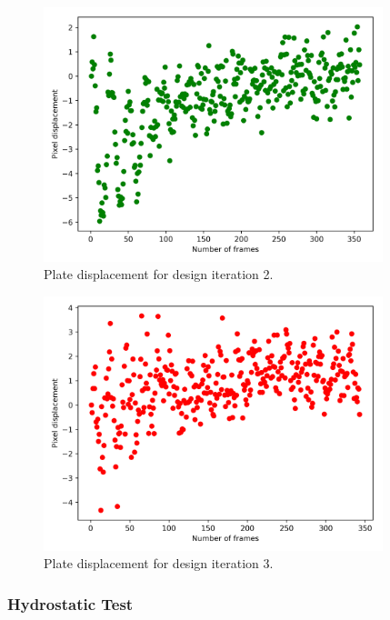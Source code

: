 \begin{figure}[H] 
	\centering
	\includegraphics[width=0.88\textwidth]{wobble_iter2.png} 
	\caption{Plate displacement for design iteration 2.}
	\label{fig:wobble_iter2}
\end{figure}

\begin{figure}[H] 
	\centering
	\includegraphics[width=0.88\textwidth]{wobble.png} 
	\caption{Plate displacement for design iteration 3.}
	\label{fig:wobble}
\end{figure}

\subsubsection{Hydrostatic Test}

